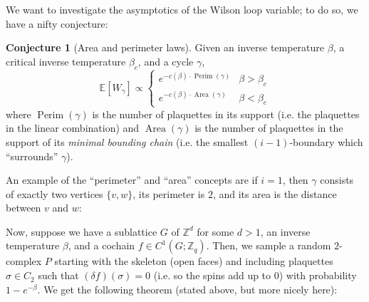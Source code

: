 \documentclass[11pt]{article}
\theoremstyle{definition}
\newtheorem*{conjecture*}{Conjecture}
\newcommand{\Z}{\mathbb{Z}}			%
\newcommand{\expectation}[1]{\mathbb{E}\left[#1\right]}			%
\newcommand{\area}[1]{\operatorname{Area}\left(#1\right)}		%
\newcommand{\perimeter}[1]{\operatorname{Perim}\left(#1\right)}
\begin{document}
 		We want to investigate the asymptotics of the Wilson loop variable; to do so, we have a nifty conjecture:
 		
 		\begin{conjecture*}[Area and perimeter laws]
 			Given an inverse temperature $\beta$, a critical inverse temperature $\beta_c$, and a cycle $\gamma$, $$ \expectation{W_\gamma} \propto \begin{cases} e^{-c(\beta) \cdot \perimeter{\gamma}} & \beta > \beta_c \\ e^{-c(\beta) \cdot \area{\gamma}} & \beta < \beta_c \end{cases} $$ where $\perimeter \gamma$ is the number of plaquettes in its support (i.e. the plaquettes in the linear combination) and $\area \gamma$ is the number of plaquettes in the support of its \textit{minimal bounding chain} (i.e. the smallest $(i-1)$-boundary which ``surrounds'' $\gamma$). 
 		\end{conjecture*}
 		
 		An example of the ``perimeter'' and ``area'' concepts are if $i=1$, then $\gamma$ consists of exactly two vertices $\{v,w\}$, its perimeter is $2$, and its area is the distance between $v$ and $w$:
 		
 		\begin{figure*}[htpb!]
 			\centering
 		\end{figure*}
 		
 		Now, suppose we have a sublattice $G$ of $\Z^d$ for some $d > 1$, an inverse temperature $\beta$, and a cochain $f \in C^1(G;\Z_q)$. Then, we sample a random $2$-complex $P$ starting with the skeleton (open faces) and including plaquettes $\sigma \in C_2$ such that $(\delta f)(\sigma) = 0$ (i.e. so the spins add up to $0$) with probability $1 - e^{-\beta}$. We get the following theorem (stated above, but more nicely here):
 		
\end{document}
